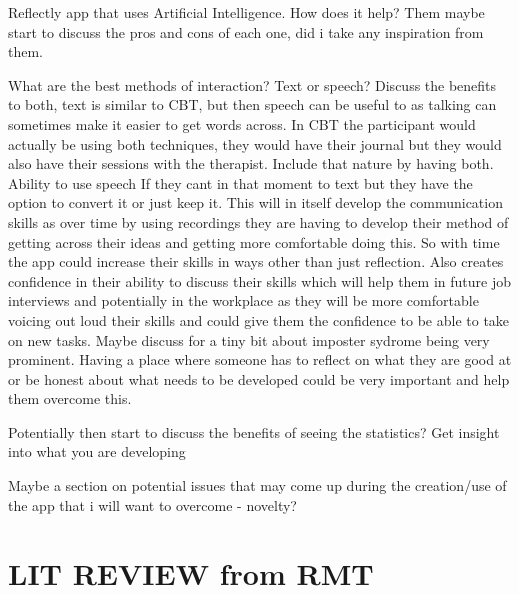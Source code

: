 \documentclass{l4proj}
\begin{document}
Reflectly app that uses Artificial Intelligence. How does it help? Them maybe start to discuss the pros and 
cons of each one, did i take any inspiration from them. 
\par 
What are the best methods of interaction? Text or speech? Discuss the benefits to both, text is similar 
to CBT, but then speech can be useful to as talking can sometimes make it easier to get words across. In
CBT the participant would actually be using both techniques, they would have their journal but they 
would also have their sessions with the therapist. Include that nature by having both. Ability to use speech If
they cant in that moment to text but they have the option to convert it or just keep it. This will in itself
develop the communication skills as over time by using recordings they are having to develop their method
of getting across their ideas and getting more comfortable doing this. So with time the app could increase their
skills in ways other than just reflection. Also creates confidence in their ability to discuss their 
skills which will help them in future job interviews and potentially in the workplace as they will be more 
comfortable voicing out loud their skills and could give them the confidence to be able to take on new tasks.
Maybe discuss for a tiny bit about imposter sydrome being very prominent. Having a place where someone has to 
reflect on what they are good at or be honest about what needs to be developed could be very important and
help them overcome this. 
\par 
Potentially then start to discuss the benefits of seeing the statistics? Get insight into what you are 
developing
\par 
Maybe a section on potential issues that may come up during the creation/use of the app that i will want to 
overcome - novelty? 



\section{LIT REVIEW from RMT} 
\end{document}
